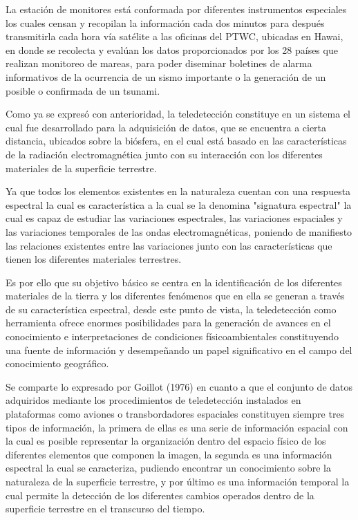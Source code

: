 La estación de monitores está conformada por diferentes instrumentos especiales los cuales censan y recopilan la información cada dos minutos para después transmitirla cada hora vía satélite a las oficinas del PTWC, ubicadas en Hawai, en donde se recolecta y evalúan los datos proporcionados por los 28 países que realizan monitoreo de mareas, para poder diseminar boletines de alarma informativos de la ocurrencia de un sismo importante o la generación de un posible o confirmada de un tsunami.

Como ya se expresó con anterioridad, la teledetección constituye en un sistema el cual fue desarrollado para la adquisición de datos, que se encuentra a cierta distancia, ubicados sobre la biósfera, en el cual está basado en las características de la radiación electromagnética junto con su interacción con los diferentes materiales de la superficie terrestre. 

Ya que todos los elementos existentes en la naturaleza cuentan con una respuesta espectral la cual es característica a la cual se la denomina "signatura espectral" la cual es capaz de estudiar las variaciones espectrales, las variaciones espaciales y las variaciones temporales de las ondas electromagnéticas, poniendo de manifiesto las relaciones existentes entre las variaciones junto con las características que tienen los diferentes materiales terrestres. 

Es por ello que su objetivo básico se centra en la identificación de los diferentes materiales de la tierra y los diferentes fenómenos que en ella se generan a través de su característica espectral, desde este punto de vista, la teledetección como herramienta ofrece enormes posibilidades para la generación de avances en el conocimiento e interpretaciones de condiciones físicoambientales constituyendo una fuente de información y desempeñando un papel significativo en el campo del conocimiento geográfico. \cite{Botana2019} 

Se comparte lo expresado por Goillot (1976) en cuanto a que el conjunto de datos adquiridos mediante los procedimientos de teledetección instalados en plataformas como aviones o transbordadores espaciales constituyen siempre tres tipos de información, la primera de ellas es una serie de información espacial con la cual es posible representar la organización dentro del espacio físico de los diferentes elementos que componen la imagen, la segunda es una información espectral la cual se caracteriza, pudiendo encontrar un conocimiento sobre la naturaleza de la superficie terrestre, y por último es una información temporal la cual permite la detección de los diferentes cambios operados dentro de la superficie terrestre en el transcurso del tiempo. 

